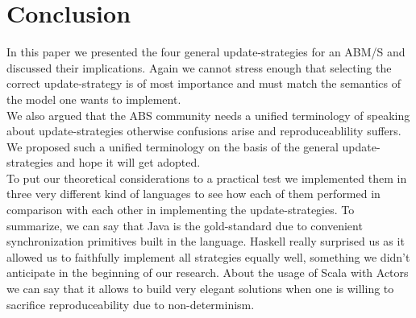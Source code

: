 \section{Conclusion}
In this paper we presented the four general update-strategies for an ABM/S and discussed their implications. Again we cannot stress enough that selecting the correct update-strategy is of most importance and must match the semantics of the model one wants to implement. \\
We also argued that the ABS community needs a unified terminology of speaking about update-strategies otherwise confusions arise and reproduceablility suffers. We proposed such a unified terminology on the basis of the general update-strategies and hope it will get adopted. \\
To put our theoretical considerations to a practical test we implemented them in three very different kind of languages to see how each of them performed in comparison with each other in implementing the update-strategies. To summarize, we can say that Java is the gold-standard due to convenient synchronization primitives built in the language. Haskell really surprised us as it allowed us to faithfully implement all strategies equally well, something we didn't anticipate in the beginning of our research. About the usage of Scala with Actors we can say that it allows to build very elegant solutions when one is willing to sacrifice reproduceability due to non-determinism.